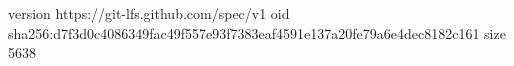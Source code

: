 version https://git-lfs.github.com/spec/v1
oid sha256:d7f3d0c4086349fac49f557e93f7383eaf4591e137a20fe79a6e4dec8182c161
size 5638
